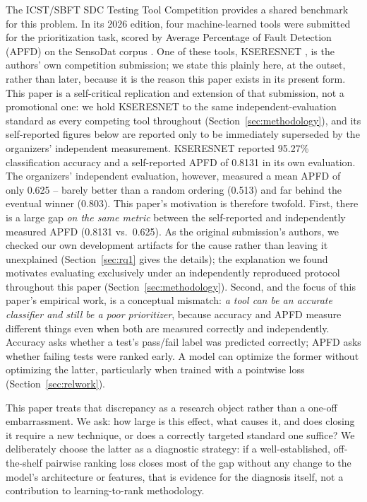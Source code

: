 \documentclass[smallextended]{svjour3}
\begin{document}
The ICST/SBFT SDC Testing Tool Competition
\citep{aryan2026icst,aryan2026sbft} provides a shared benchmark for this
problem. In its 2026 edition, four machine-learned tools were submitted for
the prioritization task, scored by Average Percentage of Fault Detection
(APFD) on the SensoDat corpus \citep{birchler2024sensodat}. One of these
tools, KSERESNET \citep{swain2026kseresnet}, is the authors' own
competition submission; we state this plainly here, at the outset, rather
than later, because it is the reason this paper exists in its present
form. This paper is a self-critical replication and extension of that
submission, not a promotional one: we hold KSERESNET to the same
independent-evaluation standard as every competing tool throughout
(Section~\ref{sec:methodology}), and its self-reported figures below are
reported only to be immediately superseded by the organizers' independent
measurement. KSERESNET reported 95.27\% classification
accuracy and a self-reported APFD of 0.8131 in its own evaluation. The
organizers' independent evaluation, however, measured a mean APFD of only
0.625 \citep{aryan2026icst} -- barely better than a random ordering (0.513)
and far behind the eventual winner (0.803). This paper's motivation is
therefore twofold. First, there is a large gap \emph{on the same metric}
between the self-reported and independently measured APFD (0.8131 vs.\
0.625). As the original submission's authors, we checked our own
development artifacts for the cause rather than leaving it unexplained
(Section~\ref{sec:rq1} gives the details); the explanation we found
motivates evaluating exclusively under an independently reproduced protocol
throughout this paper (Section~\ref{sec:methodology}). Second, and the
focus of this paper's empirical work, is a conceptual mismatch: \emph{a
tool can be an accurate classifier and still be a poor prioritizer},
because accuracy and APFD measure different things even when both are
measured correctly and independently. Accuracy asks whether a test's
pass/fail label was predicted correctly; APFD asks whether failing tests
were ranked early. A model can optimize the former without optimizing the
latter, particularly when trained with a pointwise loss
(Section~\ref{sec:relwork}).

This paper treats that discrepancy as a research object rather than a
one-off embarrassment. We ask: how large is this effect, what causes it,
and does closing it require a new technique, or does a correctly targeted
standard one suffice? We deliberately choose the latter as a diagnostic
strategy: if a well-established, off-the-shelf pairwise ranking loss
\citep{burges2005learning} closes most of the gap without any change to
the model's architecture or features, that is evidence for the diagnosis
itself, not a contribution to learning-to-rank methodology.
\end{document}
